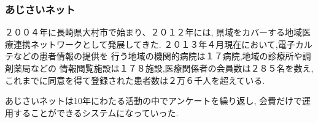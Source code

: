   \subsubsection{あじさいネット}\cite{bibi3}
    ２００４年に長崎県大村市で始まり、２０１２年には,
    県域をカバーする地域医療連携ネットワークとして発展してきた.
    ２０１３年４月現在において,電子カルテなどの患者情報の提供を
    行う地域の機関的病院は１７病院,地域の診療所や調剤薬局などの
    情報閲覧施設は１７８施設,医療関係者の会員数は２８５名を数え,
    これまでに同意を得て登録された患者数は２万６千人を超えている.

    あじさいネットは10年にわたる活動の中でアンケートを繰り返し,
    会費だけで運用することができるシステムになっていった.
    \cite{bibi3}
